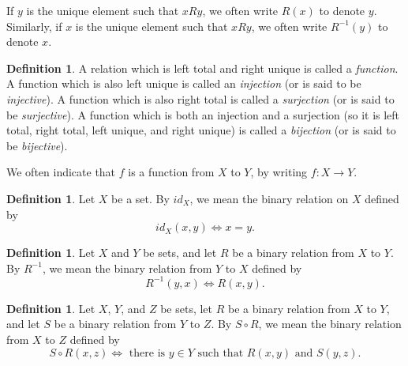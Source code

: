 \documentclass[letterpaper]{article}
\theoremstyle{definition}
\newtheorem{definition}[theorem]{Definition}
\newcommand{\defterm}{\emph}
\newcommand{\inverse}[1]{{#1^{-1}}}
\newcommand{\compose}{\circ}
\begin{document}
If \(y\) is the unique element such that \(x R y\), we often write
\(R(x)\) to denote \(y\).  Similarly, if \(x\) is the unique element
such that \(xRy\), we often write \(\inverse{R}(y)\) to denote \(x\).

\begin{definition}
  A relation which is left total and right unique is called a
  \defterm{function}.  A function which is also left unique is called
  an \defterm{injection} (or is said to be \defterm{injective}).  A
  function which is also right total is called a \defterm{surjection}
  (or is said to be \defterm{surjective}).  A function which is both
  an injection and a surjection (so it is left total, right total,
  left unique, and right unique) is called a \defterm{bijection} (or
  is said to be \defterm{bijective}).
\end{definition}

We often indicate that \(f\) is a function from \(X\) to \(Y\), by
writing \(f:X \to Y\).

\begin{definition}
  Let \(X\) be a set.  By \(id_X\), we mean the binary relation on
  \(X\) defined by
  \[id_X(x,y) \iff x = y \text{.}\]
\end{definition}

\begin{definition}
  Let \(X\) and \(Y\) be sets, and let \(R\) be a binary relation from
  \(X\) to \(Y\).  By \(\inverse{R}\), we mean the binary relation
  from \(Y\) to \(X\) defined by
  \[\inverse{R}(y,x) \iff R(x,y) \text{.}\]
\end{definition}

\begin{definition}
  Let \(X\), \(Y\), and \(Z\) be sets, let \(R\) be a binary relation
  from \(X\) to \(Y\), and let \(S\) be a binary relation from \(Y\)
  to \(Z\).  By \(S \compose R\), we mean the binary relation from
  \(X\) to \(Z\) defined by
  \[S \compose R(x,z) \iff \text{ there is } y \in Y \text{ such that } R(x,y) \text{ and } S(y,z) \text{.}\]
\end{definition}
\end{document}
